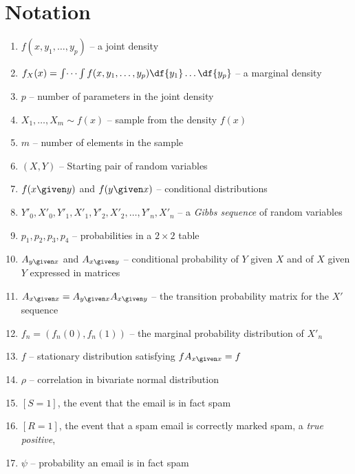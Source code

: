 \documentclass[12pt]{article}
\begin{document}
\hr

\section*{Notation}
\begin{enumerate}
    \item
        \( f(x, y_1, \dots, y_p) \) -- a joint density
    \item
        \( f_{X}(x) = \int \dots \int f(x, y_1, \dots, y_p) \df{y_1}
        \dots \df{y_p} \) -- a marginal density
    \item
        \( p \) -- number of parameters in the joint density
    \item
        \( X_1, \dots, X_m \sim f(x) \) -- sample from the density \( f(x)
        \)
    \item
        \( m \) -- number of elements in the sample
    \item
        \( (X, Y) \) -- Starting pair of random variables
    \item
        \( f(x \given y) \) and \( f(y \given x) \) -- conditional
        distributions
    \item
        \( Y'_0, X'_0, Y'_1, X'_1, Y'_2, X'_2, \dots, Y'_n, X'_n \) -- a
        \emph{Gibbs sequence} of random variables
    \item
        \( p_1, p_2, p_3, p_4 \) -- probabilities in a \( 2 \times 2 \)
        table
    \item
        \( A_{y \given x} \) and \( A_{x \given y} \) -- conditional
        probability of \( Y \) given \( X \) and of \( X \) given \( Y \)
        expressed in matrices
    \item
        \( A_{x \given x} = A_{ y \given x } A_{x \given y} \) -- the
        transition probability matrix for the \( X' \) sequence
    \item
        \( f_n = (f_n(0), f_n(1)) \) -- the marginal probability
        distribution of \( X'_n \)
    \item
        \( f \) -- stationary distribution satisfying \( f A_{x \given x}
        = f \)
    \item
        \( \rho \) -- correlation in bivariate normal distribution
    \item
        \( [S=1] \), the event that the email is in fact spam
    \item
        \( [R=1] \), the event that a spam email is correctly marked
        spam, a \emph{true positive},
    \item
        \( \psi \) -- probability an email is in fact spam

\end{enumerate}
\end{document}
